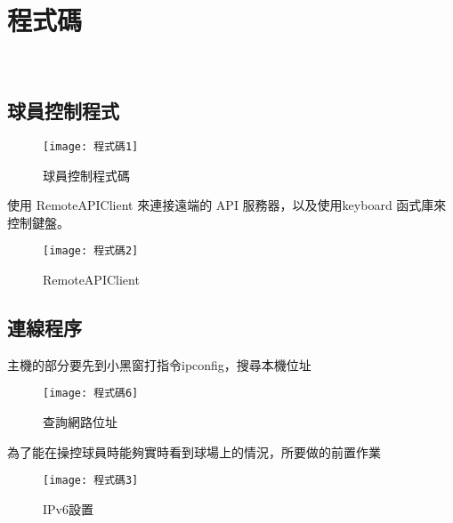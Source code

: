\chapter{程式碼}\

\section{球員控制程式}
 
 \begin{figure}[hbt!]
\begin{center}
\texttt{[image: 程式碼1]}
\caption{\Large 球員控制程式碼}\label{fig.程式碼1}
\end{center}
\end{figure}

\begin{center}
 使用 RemoteAPIClient 來連接遠端的 API 服務器，以及使用keyboard 函式庫來控制鍵盤。\\
 \end{center}
 
\begin{figure}[hbt!]
\begin{center}
\texttt{[image: 程式碼2]}
\caption{\Large RemoteAPIClient}\label{fig.程式碼2}
\end{center}
\end{figure}

\newpage
 
\section{連線程序}

\begin{center}
主機的部分要先到小黑窗打指令ipconfig，搜尋本機位址
\end{center}

\begin{figure}[hbt!]
\begin{center}
\texttt{[image: 程式碼6]}
\caption{\Large 查詢網路位址}\label{fig.程式碼6}
\end{center}
\end{figure}

\begin{center}
為了能在操控球員時能夠實時看到球場上的情況，所要做的前置作業
\end{center}

\begin{figure}[hbt!]
\begin{center}
\texttt{[image: 程式碼3]}
\caption{\Large IPv6設置}\label{fig.程式碼3}
\end{center}
\end{figure}

